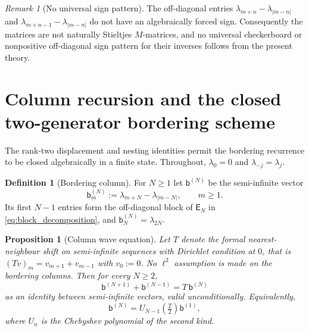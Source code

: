 \documentclass[preprint,12pt]{elsarticle}
\numberwithin{equation}{section}
\theoremstyle{plain}
\newtheorem{proposition}[theorem]{Proposition}
\theoremstyle{definition}
\newtheorem{definition}[theorem]{Definition}
\theoremstyle{remark}
\newtheorem{remark}[theorem]{Remark}
\newcommand{\E}{\mathsf E}
\begin{document}
\begin{remark}[No universal sign pattern]
\label{rem:no_M_matrix}
The off-diagonal entries $\lambda_{m+n}-\lambda_{|m-n|}$ and $\lambda_{m+n-1}-\lambda_{|m-n|}$ do not have an algebraically forced sign. Consequently the matrices are not naturally Stieltjes $M$-matrices, and no universal checkerboard or nonpositive off-diagonal sign pattern for their inverses follows from the present theory.
\end{remark}


\section{Column recursion and the closed two-generator bordering scheme}
\label{sec:two_generator}

The rank-two displacement and nesting identities permit the bordering recurrence to be closed algebraically in a finite state.  Throughout, $\lambda_0=0$ and $\lambda_{-j}=\lambda_j$.

\begin{definition}[Bordering column]
\label{def:bordering_column}
For $N\ge1$ let $\mathsf b^{(N)}$ be the semi-infinite vector
\begin{equation}
 \mathsf b^{(N)}_m:=\lambda_{m+N}-\lambda_{|m-N|},
 \qquad m\ge1.
 \label{eq:bordering_column}
\end{equation}
Its first $N-1$ entries form the off-diagonal block of $\E_N$ in
\eqref{eq:block_decomposition}, and $\mathsf b^{(N)}_N=\lambda_{2N}$.
\end{definition}

\begin{proposition}[Column wave equation]
\label{prop:column_wave_equation}
Let $T$ denote the formal nearest-neighbour shift on semi-infinite sequences with Dirichlet
condition at $0$, that is $(Tv)_m=v_{m+1}+v_{m-1}$ with $v_0:=0$.  No $\ell^2$ assumption is
made on the bordering columns.  Then for every $N\ge2$,
\begin{equation}
 \boxed{\;
 \mathsf b^{(N+1)}+\mathsf b^{(N-1)}=T\,\mathsf b^{(N)} \;}
 \label{eq:column_wave_equation}
\end{equation}
as an identity between semi-infinite vectors, valid unconditionally.  Equivalently,
\begin{equation}
 \mathsf b^{(N)}=U_{N-1}\!\left(\tfrac{T}{2}\right)\mathsf b^{(1)},
 \label{eq:column_chebyshev}
\end{equation}
where $U_n$ is the Chebyshev polynomial of the second kind.
\end{proposition}
\end{document}
